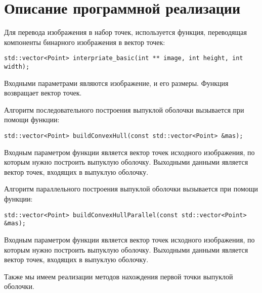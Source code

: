 \documentclass{report}
\begin{document}
\section*{Описание программной реализации}
Для перевода изображения в набор точек, используется функция, переводящая компоненты бинарного изображения в вектор точек:
\begin{lstlisting}
std::vector<Point> interpriate_basic(int ** image, int height, int width);
\end{lstlisting}
\par Входными параметрами являются изображение, и его размеры. Функция возвращает вектор точек.
\par
Алгоритм последовательного построения выпуклой оболочки вызывается при помощи функции:
\begin{lstlisting}
std::vector<Point> buildConvexHull(const std::vector<Point> &mas);
\end{lstlisting}
\par Входным параметром функции является вектор точек исходного изображения, по которым нужно построить выпуклую оболочку. Выходными данными является вектор точек, входящих в выпуклую оболочку.
\par Алгоритм параллельного построения выпуклой оболочки вызывается при помощи функции:
\begin{lstlisting}
std::vector<Point> buildConvexHullParallel(const std::vector<Point> &mas);
\end{lstlisting}
\par Входным параметром функции является вектор точек исходного изображения, по которым нужно построить выпуклую оболочку. Выходными данными является вектор точек, входящих в выпуклую оболочку.
\par Также мы имеем реализации методов нахождения первой точки выпуклой оболочки.
\end{document}
